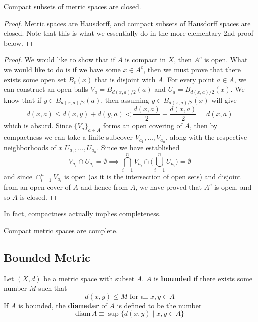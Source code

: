   \begin{theorem}
    Compact subsets of metric spaces are closed. 
  \end{theorem}
  \begin{proof}
    Metric spaces are Hausdorff, and compact subsets of Hausdorff spaces are closed. Note that this is what we essentially do in the more elementary 2nd proof below. 
  \end{proof}
  \begin{proof}
    We would like to show that if $A$ is compact in $X$, then $A^c$ is open. What we would like to do is if we have some $x \in A^c$, then we must prove that there exists some open set $B_\epsilon (x)$ that is disjoint with $A$. For every point $a \in A$, we can construct an open balls $V_a = B_{d(x, a)/2} (a)$ and $U_a = B_{d(x, a)/2} (x)$. We know that if $y \in B_{d(x, a)/2}(a)$, then assuming $y \in B_{d(x, a)/2} (x)$ will give
    \begin{equation}
      d(x, a) \leq d(x, y) + d(y, a) < \frac{d(x, a)}{2} + \frac{d(x, a)}{2} = d(x, a)
    \end{equation}
    which is absurd. 
    Since $\{V_a\}_{a \in A}$ forms an open covering of $A$, then by compactness we can take a finite subcover $V_{a_1}, \ldots, V_{a_n}$, along with the respective neighborhoods of $x$ $U_{a_1}, \ldots, U_{a_n}$. Since we have established 
    \begin{equation}
      V_{a_i} \cap U_{a_i} = \emptyset \implies \bigcap_{i=1}^n V_{a_i} \cap \bigg( \bigcup_{i=1}^n U_{a_i} \bigg) = \emptyset
    \end{equation}
    and since $\cap_{i=1}^n V_{a_i}$ is open (as it is the intersection of open sets) and disjoint from an open cover of $A$ and hence from $A$, we have proved that $A^c$ is open, and so $A$ is closed. 
  \end{proof}

  In fact, compactness actually implies completeness. 

  \begin{theorem}
    Compact metric spaces are complete. 
  \end{theorem} 

\subsection{Bounded Metric}

  \begin{definition}
    Let $(X, d)$ be a metric space with subset $A$. $A$ is \textbf{bounded} if there exists some number $M$ such that
    \begin{equation}
      d (x, y) \leq M \text{ for all } x,y \in A
    \end{equation}
    If $A$ is bounded, the \textbf{diameter} of $A$ is defined to be the number
    \begin{equation}
      \text{diam}\, A \equiv \sup{\{d(x, y) \mid x, y \in A\}}
    \end{equation}
  \end{definition}

